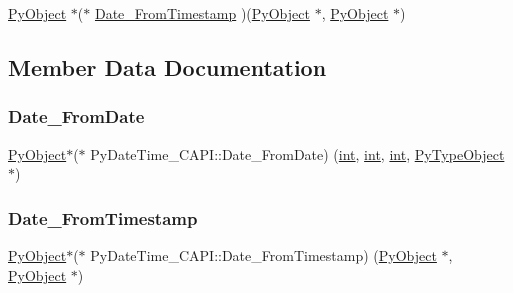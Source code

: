 \begin{DoxyCompactItemize}
\item 
\mbox{\hyperlink{_python27_2object_8h_aadc84ac7aed2cfa6f20c25f62bf3dac7}{Py\+Object}} $\ast$($\ast$ \mbox{\hyperlink{struct_py_date_time___c_a_p_i_a5f2e838aedbb4a18c649736ba252613b}{Date\+\_\+\+From\+Timestamp}} )(\mbox{\hyperlink{_python27_2object_8h_aadc84ac7aed2cfa6f20c25f62bf3dac7}{Py\+Object}} $\ast$, \mbox{\hyperlink{_python27_2object_8h_aadc84ac7aed2cfa6f20c25f62bf3dac7}{Py\+Object}} $\ast$)
\end{DoxyCompactItemize}


\subsection{Member Data Documentation}
\mbox{\label{struct_py_date_time___c_a_p_i_aa87be8a59753b780632df32f8e450477}} 
\subsubsection{\texorpdfstring{Date\_FromDate}{Date\_FromDate}}
{\footnotesize\ttfamily \mbox{\hyperlink{_python27_2object_8h_aadc84ac7aed2cfa6f20c25f62bf3dac7}{Py\+Object}}$\ast$($\ast$ Py\+Date\+Time\+\_\+\+C\+A\+P\+I\+::\+Date\+\_\+\+From\+Date) (\mbox{\hyperlink{warnings_8h_a74f207b5aa4ba51c3a2ad59b219a423b}{int}}, \mbox{\hyperlink{warnings_8h_a74f207b5aa4ba51c3a2ad59b219a423b}{int}}, \mbox{\hyperlink{warnings_8h_a74f207b5aa4ba51c3a2ad59b219a423b}{int}}, \mbox{\hyperlink{_python27_2object_8h_a42a55dd6e973872c7a6bc61632070f6f}{Py\+Type\+Object}} $\ast$)}

\mbox{\label{struct_py_date_time___c_a_p_i_a5f2e838aedbb4a18c649736ba252613b}} 
\subsubsection{\texorpdfstring{Date\_FromTimestamp}{Date\_FromTimestamp}}
{\footnotesize\ttfamily \mbox{\hyperlink{_python27_2object_8h_aadc84ac7aed2cfa6f20c25f62bf3dac7}{Py\+Object}}$\ast$($\ast$ Py\+Date\+Time\+\_\+\+C\+A\+P\+I\+::\+Date\+\_\+\+From\+Timestamp) (\mbox{\hyperlink{_python27_2object_8h_aadc84ac7aed2cfa6f20c25f62bf3dac7}{Py\+Object}} $\ast$, \mbox{\hyperlink{_python27_2object_8h_aadc84ac7aed2cfa6f20c25f62bf3dac7}{Py\+Object}} $\ast$)}

